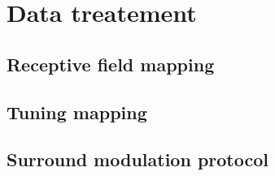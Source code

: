 \section{Data treatement}
\label{sec:sectiond}

\subsection{Receptive field mapping}
\label{subsec:subasectionC}

\subsection{Tuning mapping}
\label{subsec:subbsectionC}

\subsection{Surround modulation protocol}
\label{subsec:subcsectionC}